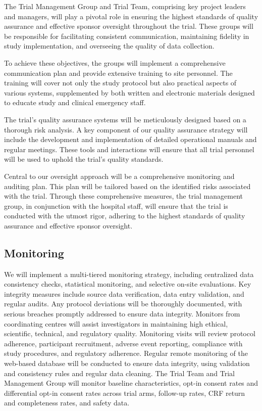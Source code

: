 \documentclass[
]{scrartcl}
\begin{document}
The Trial Management Group and Trial Team, comprising key project
leaders and managers, will play a pivotal role in ensuring the highest
standards of quality assurance and effective sponsor oversight
throughout the trial. These groups will be responsible for facilitating
consistent communication, maintaining fidelity in study implementation,
and overseeing the quality of data collection.

To achieve these objectives, the groups will implement a comprehensive
communication plan and provide extensive training to site personnel. The
training will cover not only the study protocol but also practical
aspects of various systems, supplemented by both written and electronic
materials designed to educate study and clinical emergency staff.

The trial's quality assurance systems will be meticulously designed
based on a thorough risk analysis. A key component of our quality
assurance strategy will include the development and implementation of
detailed operational manuals and regular meetings. These tools and
interactions will ensure that all trial personnel will be used to uphold
the trial's quality standards.

Central to our oversight approach will be a comprehensive monitoring and
auditing plan. This plan will be tailored based on the identified risks
associated with the trial. Through these comprehensive measures, the
trial management group, in conjunction with the hospital staff, will
ensure that the trial is conducted with the utmost rigor, adhering to
the highest standards of quality assurance and effective sponsor
oversight.

\hypertarget{monitoring}{%
\subsection{Monitoring}\label{monitoring}}

We will implement a multi-tiered monitoring strategy, including
centralized data consistency checks, statistical monitoring, and
selective on-site evaluations. Key integrity measures include source
data verification, data entry validation, and regular audits. Any
protocol deviations will be thoroughly documented, with serious breaches
promptly addressed to ensure data integrity. Monitors from coordinating
centres will assist investigators in maintaining high ethical,
scientific, technical, and regulatory quality. Monitoring visits will
review protocol adherence, participant recruitment, adverse event
reporting, compliance with study procedures, and regulatory adherence.
Regular remote monitoring of the web-based database will be conducted to
ensure data integrity, using validation and consistency rules and
regular data cleaning. The Trial Team and Trial Management Group will
monitor baseline characteristics, opt-in consent rates and differential
opt-in consent rates across trial arms, follow-up rates, CRF return and
completeness rates, and safety data.
\end{document}
